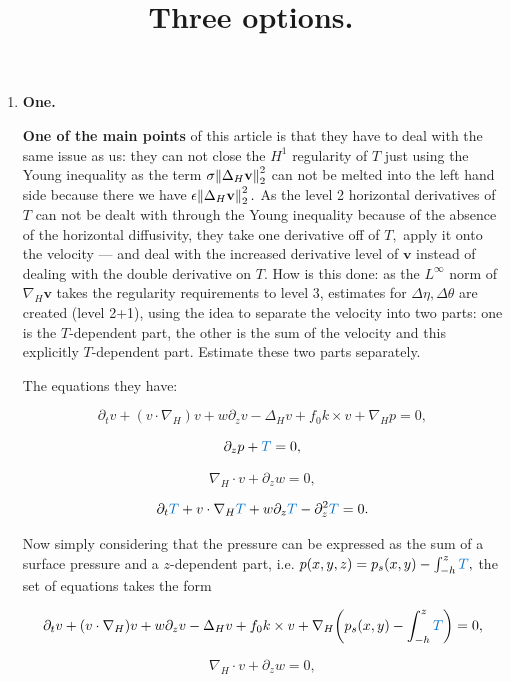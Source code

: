 \documentclass[11pt]{article}
\title{Three options.}
\begin{document}
\date{}
\maketitle

\begin{enumerate}

\item \textbf{One.}

\textbf{One of the main points} of this article is that they have to deal with the same issue as us: they can not close the $H^1$ regularity of $T$ just using the Young inequality as the term $\sigma \norm{\Delta_H \mathbf{v}}_2^2$ can not be melted into the left hand side because there we have $\epsilon \norm{\Delta_H \mathbf{v}}_2^2.$ As the level 2 horizontal derivatives of $T$ can not be dealt with through the Young inequality because of the absence of the horizontal diffusivity, they take one derivative off of $T,$ apply it onto the velocity --- and deal with the increased derivative level of $\mathbf{v}$ instead of dealing with the double derivative on $T.$ How is this done: as the $L^\infty$ norm of $\nabla_H \mathbf{v}$ takes the regularity requirements to level 3, estimates for $\Delta \eta, \Delta \theta$ are created (level 2+1), using the idea to separate the velocity into two parts: one is the $T$-dependent part, the other is the sum of the velocity and this explicitly $T$-dependent part. Estimate these two parts separately.

The equations they have:

$$ \partial_t v + (v \cdot \nabla_H) v + w \partial_z v - \Delta_H v + f_0 k \times v + \nabla_H p = 0, $$

$$ \partial_z p + \textcolor{trueblue}{T} = 0, $$

$$ \nabla_H \cdot v + \partial_z w = 0, $$

$$ \partial_t \textcolor{trueblue}{T}  + v \cdot \nabla_H \textcolor{trueblue}{T}  + w \partial_z \textcolor{trueblue}{T}  - \partial_z ^ 2 \textcolor{trueblue}{T}  = 0. $$

Now simply considering that the pressure can be expressed as the sum of a surface pressure and a $z$-dependent part, i.e. $p(x,y,z) = p_s (x,y) - \int_{-h}^z \textcolor{trueblue}{T},$ the set of equations takes the form

$$ \partial_t v + (v \cdot \nabla_H) v + w \partial_z v - \Delta_H v + f_0 k \times v + \nabla_H \bigg ( p_s (x,y) - \int_{-h}^z \textcolor{trueblue}{T} \bigg) = 0, $$

$$ \nabla_H \cdot v + \partial_z w = 0, $$


\end{enumerate}
\end{document}
